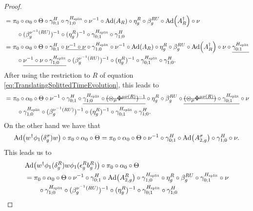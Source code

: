 \documentclass[12pt,a4paper,twoside]{article}
\newcommand{\stkout}[1]{\ifmmode\text{\sout{\ensuremath{#1}}}\else\sout{#1}\fi}
\let\originalleft\left
\let\originalright\right
\renewcommand{\left}{\mathopen{}\mathclose\bgroup\originalleft}
\renewcommand{\right}{\aftergroup\egroup\originalright}
\newcommand{\Ad}[1]{\textrm{Ad}\left(#1\right)}
\theoremstyle{definition}
\numberwithin{equation}{section}
\begin{document}
\begin{proof}
\begin{align}
		&=\pi_0\circ\alpha_0\circ\Theta\circ\gamma^H_{0;1}\circ\gamma^{H_{\text{split}}}_{1;0}\circ\nu^{-1}\circ\Ad{A_R}\circ\eta_g^R\circ\beta_g^{RU}\circ\Ad{A_R^\dagger}\circ\nu\\
		\nonumber
		&\qquad\circ(\beta_g^{\nu^{-1}(RU)})^{-1}\circ(\eta_g^R)^{-1}\circ\gamma^{H_{\text{split}}}_{0;1}\circ\gamma^{H}_{1;0}\\
		&=\pi_0\circ\alpha_0\circ\Theta\circ\gamma^H_{0;1}\circ\underline{\nu^{-1}\circ\nu}\circ\gamma^{H_{\text{split}}}_{1;0}\circ\nu^{-1}\circ\Ad{A_R}\circ\eta_g^R\circ\beta_g^{RU}\circ\Ad{A_R^\dagger}\circ\nu\circ\underline{\gamma^{H_\text{split}}_{0;1}}\\
		\nonumber
		&\qquad \circ\underline{\nu^{-1}\circ\nu\circ\gamma^{H_{\text{split}}}_{1;0}}\circ(\beta_g^{\nu^{-1}(RU)})^{-1}\circ(\eta_g^R)^{-1}\circ\gamma^{H_{\text{split}}}_{0;1}\circ\gamma^{H}_{1;0}.
	\end{align}
After using the restriction to $R$ of equation \eqref{eq:TranslatingSplittedTimeEvolution}, this leads to
	\begin{align}
		&=\pi_0\circ\alpha_0\circ\Theta\circ\nu^{-1}\circ\gamma^H_{0;1}\circ\underline{\gamma^{H_{\text{split}}}_{1;0}\circ\stkout{(\otimes_\mu\Phi^{\mu\nu(R)})^{-1}}}\circ\eta_g^R\circ\beta_g^{RU}\circ\underline{\stkout{(\otimes_\mu\Phi^{\mu\nu(R)})}\circ\gamma^{H_\text{split}}_{0;1}}\circ\nu\\
		\nonumber
		&\qquad \circ\gamma^{H_\text{split}}_{1;0}\circ(\beta_g^{\nu^{-1}(RU)})^{-1}\circ(\eta_g^R)^{-1}\circ\gamma^{H_{\text{split}}}_{0;1}\circ\gamma^{H}_{1;0}.
	\end{align}
	On the other hand we have that
	\begin{equation}
		\Ad{w^\dagger \phi_1(\delta_g^\sigma)w}\circ\pi_0\circ\alpha_0\circ\Theta=\pi_0\circ\alpha_0\circ\Theta\circ\nu^{-1}\circ\gamma^H_{0;1}\circ\Ad{A^\sigma_{2,g}}\circ\gamma^H_{1;0}\circ\nu.
	\end{equation}
	This leads us to
	\begin{align}
		&\Ad{w^\dagger\phi_1(\delta_g^R)w\phi_1(\epsilon_g^R b_g^R)}\circ\pi_0\circ\alpha_0\circ\Theta\\
		&=\pi_0\circ\alpha_0\circ\Theta\circ\nu^{-1}\circ\gamma^H_{0;1}\circ\Ad{A_{2,g}^R}\circ\gamma^{H_{\text{split}}}_{1;0}\circ\eta_g^R\circ\beta_g^{RU}\circ\gamma^{H_\text{split}}_{0;1}\circ\nu\\
		\nonumber
		&\qquad \circ\gamma^{H_\text{split}}_{1;0}\circ(\beta_g^{\nu^{-1}(RU)})^{-1}\circ(\eta_g^R)^{-1}\circ\gamma^{H_{\text{split}}}_{0;1}\circ\gamma^{H}_{1;0}\\

\end{align}
\end{proof}
\end{document}
